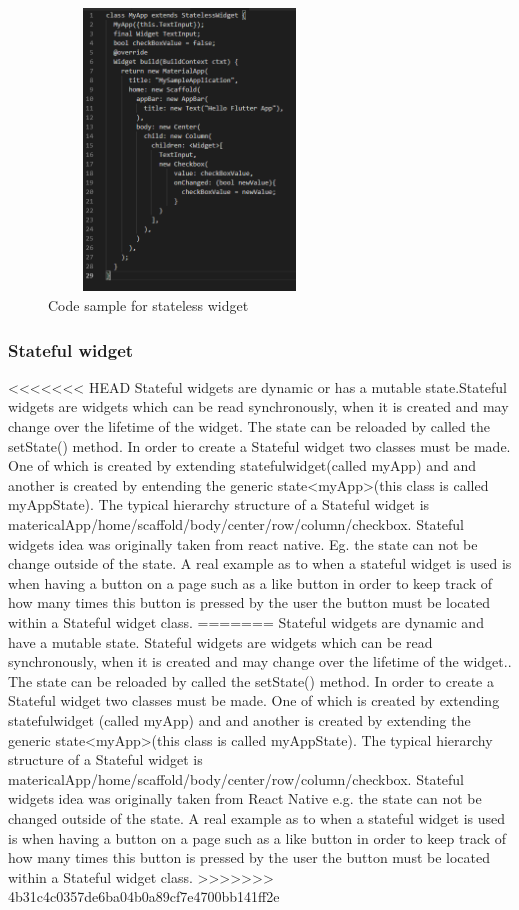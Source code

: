 \begin{figure}[ht!]
    \centering
 \includegraphics[width=75mm, height=75mm,scale=0.5]{img/stateless.PNG}
\caption{Code sample for stateless widget}
\label{fig:stateless}
\end{figure}

\subsubsection{Stateful widget}
<<<<<<< HEAD
Stateful widgets are dynamic or has a mutable state.Stateful widgets are widgets which can be read synchronously, when it is created and may change over the lifetime of the widget. The state can be reloaded by called the setState() method. In order to create a Stateful widget two classes must be made. One of which is created by extending statefulwidget(called myApp) and and another is created by entending the generic state<myApp>(this class is called myAppState). The typical hierarchy structure of a Stateful widget is matericalApp/home/scaffold/body/center/row/column/checkbox.\cite{widgets} \cite{stateful} Stateful widgets idea was originally taken from react native. Eg. the state can not  be change outside of the state. A real example as to when a stateful widget is used is when having a button on a page such as a like button in order to keep track of how many times this button is pressed by the user the button must be located within a Stateful widget class. \cite{choudhary_2019}
=======
Stateful widgets are dynamic and have a mutable state. Stateful widgets are widgets which can be read synchronously, when it is created and may change over the lifetime of the widget.\cite{stateful_widgets_2018}. The state can be reloaded by called the setState() method. In order to create a Stateful widget two classes must be made. One of which is created by extending statefulwidget (called myApp) and and another is created by extending the generic state<myApp>(this class is called myAppState). The typical hierarchy structure of a Stateful widget is matericalApp/home/scaffold/body/center/row/column/checkbox.\cite{widgets} \cite{stateful} Stateful widgets idea was originally taken from React Native e.g. the state can not  be changed outside of the state. A real example as to when a stateful widget is used is when having a button on a page such as a like button in order to keep track of how many times this button is pressed by the user the button must be located within a Stateful widget class. \cite{choudhary_2019}
>>>>>>> 4b31c4c0357de6ba04b0a89cf7e4700bb141ff2e


